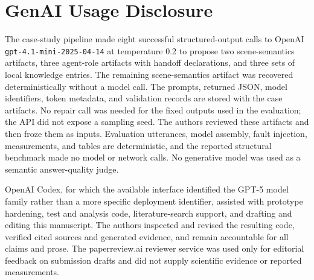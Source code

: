 \section*{GenAI Usage Disclosure}

The case-study pipeline made eight successful structured-output calls to OpenAI
\texttt{gpt-4.1-mini-2025-04-14} at temperature 0.2 to propose two
scene-semantics artifacts, three agent-role artifacts with handoff declarations,
and three sets of local knowledge entries. The remaining scene-semantics
artifact was recovered deterministically without a model call.
The prompts, returned JSON, model identifiers, token metadata, and validation
records are stored with the case artifacts. No repair call was needed for the
fixed outputs used in the evaluation; the API did not expose a sampling seed.
The authors reviewed these artifacts and then froze them as inputs. Evaluation
utterances, model assembly, fault injection, measurements, and tables are
deterministic, and the reported structural benchmark made no model or network
calls. No generative model was used as a semantic answer-quality judge.

OpenAI Codex, for which the available interface identified the GPT-5 model
family rather than a more specific deployment identifier, assisted with
prototype hardening, test and analysis code, literature-search support, and
drafting and editing this manuscript. The authors inspected and revised the
resulting code, verified cited sources and generated evidence, and remain
accountable for all claims and prose. The paperreview.ai reviewer service was
used only for editorial feedback on submission drafts and did not supply
scientific evidence or reported measurements.

